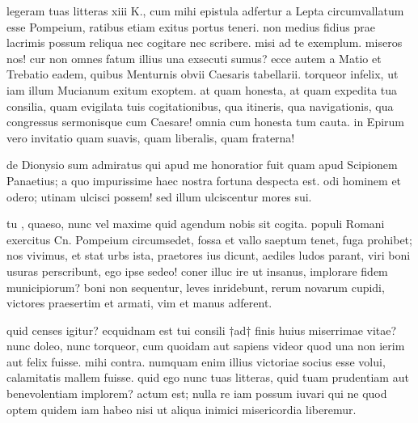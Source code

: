 


 legeram tuas litteras xiii K., cum mihi epistula adfertur a Lepta circumvallatum esse Pompeium, ratibus etiam exitus portus teneri. non medius fidius prae lacrimis possum reliqua nec cogitare nec scribere. misi ad te exemplum. miseros nos! cur non omnes fatum illius una exsecuti sumus? ecce autem a Matio et Trebatio eadem, quibus Menturnis obvii Caesaris tabellarii. torqueor infelix, ut iam illum Mucianum exitum exoptem. at quam honesta, at quam expedita tua consilia, quam evigilata tuis cogitationibus, qua itineris, qua navigationis, qua congressus sermonisque cum Caesare! omnia cum honesta tum cauta. in Epirum vero invitatio quam suavis, quam liberalis, quam fraterna!

 de Dionysio sum admiratus qui apud me honoratior fuit quam apud Scipionem Panaetius; a quo impurissime haec nostra fortuna despecta est. odi hominem et odero; utinam ulcisci possem! sed illum ulciscentur mores sui.

 tu , quaeso, nunc vel maxime quid agendum nobis sit cogita. populi Romani exercitus Cn. Pompeium circumsedet, fossa et vallo saeptum tenet, fuga prohibet; nos vivimus, et stat urbs ista, praetores ius dicunt, aediles ludos parant, viri boni usuras perscribunt, ego ipse sedeo! coner illuc ire ut insanus, implorare fidem municipiorum? boni non sequentur, leves inridebunt, rerum novarum cupidi, victores praesertim et armati, vim et manus adferent.

 quid censes igitur? ecquidnam est tui consili †ad† finis huius miserrimae vitae? nunc doleo, nunc torqueor, cum quoidam aut sapiens videor quod una non ierim aut felix fuisse. mihi contra. numquam enim illius victoriae socius esse volui, calamitatis mallem fuisse. quid ego nunc tuas litteras, quid tuam prudentiam aut benevolentiam implorem? actum est; nulla re iam possum iuvari qui ne quod optem quidem iam habeo nisi ut aliqua inimici misericordia liberemur.
